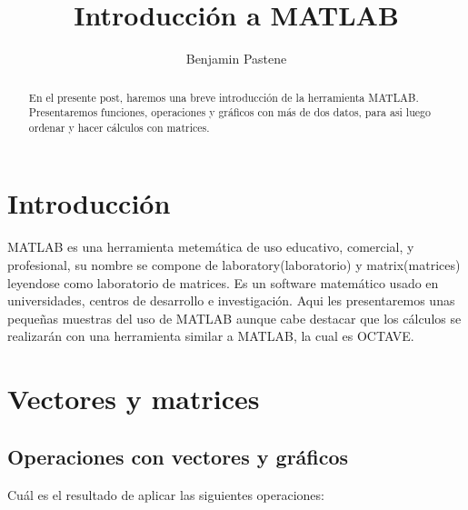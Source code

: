 \documentclass[a4paper]{article}
\title{Introducción a MATLAB}
\author{Benjamin Pastene}
\begin{document}
\maketitle

\begin{abstract}
En el presente post, haremos una breve introducción de la herramienta MATLAB. Presentaremos funciones, operaciones y gráficos con más de dos datos, para asi luego ordenar y hacer cálculos con matrices.
\end{abstract}

\section{Introducción}

 MATLAB es una herramienta metemática de uso educativo, comercial, y profesional, su nombre se compone de laboratory(laboratorio) y matrix(matrices) leyendose como laboratorio de matrices. Es un software matemático usado en universidades, centros de desarrollo e investigación. Aqui les presentaremos unas pequeñas muestras del uso de MATLAB aunque cabe destacar que los cálculos se realizarán con una herramienta similar a MATLAB, la cual es OCTAVE. 

\section{Vectores y matrices}

\subsection{Operaciones con vectores y gráficos}

Cuál es el resultado de aplicar las siguientes operaciones:
\end{document}
